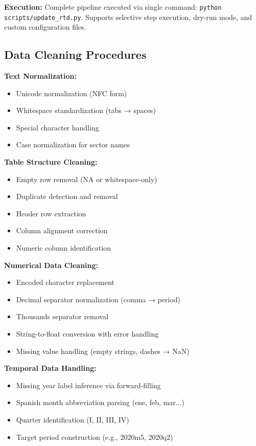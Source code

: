 \documentclass[12pt]{article}
\begin{document}
\textbf{Execution:} Complete pipeline executed via single command: \texttt{python scripts/update\_rtd.py}. Supports selective step execution, dry-run mode, and custom configuration files.

\subsection*{Data Cleaning Procedures}

\textbf{Text Normalization:}
\begin{itemize}
\item Unicode normalization (NFC form)
\item Whitespace standardization (tabs → spaces)
\item Special character handling
\item Case normalization for sector names
\end{itemize}

\textbf{Table Structure Cleaning:}
\begin{itemize}
\item Empty row removal (NA or whitespace-only)
\item Duplicate detection and removal
\item Header row extraction
\item Column alignment correction
\item Numeric column identification
\end{itemize}

\textbf{Numerical Data Cleaning:}
\begin{itemize}
\item Encoded character replacement
\item Decimal separator normalization (comma → period)
\item Thousands separator removal
\item String-to-float conversion with error handling
\item Missing value handling (empty strings, dashes → NaN)
\end{itemize}

\textbf{Temporal Data Handling:}
\begin{itemize}
\item Missing year label inference via forward-filling
\item Spanish month abbreviation parsing (ene, feb, mar...)
\item Quarter identification (I, II, III, IV)
\item Target period construction (e.g., 2020m5, 2020q2)
\end{itemize}
\end{document}
